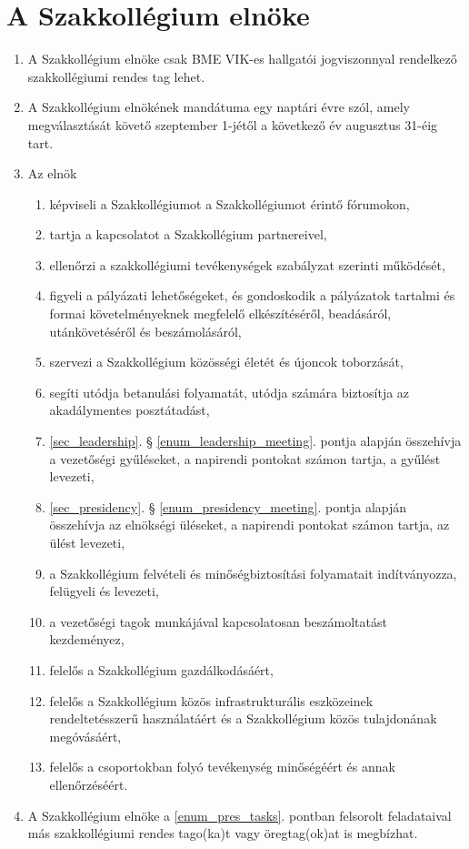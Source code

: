 \documentclass[12pt]{report}
\begin{document}

\section{A Szakkollégium elnöke} \label{sec_president}

\begin{enumerate}
\item A Szakkollégium elnöke csak BME VIK-es hallgatói jogviszonnyal rendelkező szakkollégiumi rendes tag lehet.
\item A Szakkollégium elnökének mandátuma egy naptári évre szól, amely megválasztását követő szeptember 1-jétől a következő év augusztus 31-éig tart.
\item Az elnök \label{enum_pres_tasks}

\begin{enumerate} 
  \item képviseli a Szakkollégiumot a Szakkollégiumot érintő fórumokon,
  \item tartja a kapcsolatot a Szakkollégium partnereivel,
  \item ellenőrzi a szakkollégiumi tevékenységek szabályzat szerinti működését,
  \item figyeli a pályázati lehetőségeket, és gondoskodik a pályázatok tartalmi és formai követelményeknek megfelelő elkészítéséről, beadásáról, utánkövetéséről és beszámolásáról,
  \item szervezi a Szakkollégium közösségi életét és újoncok toborzását,
  \item segíti utódja betanulási folyamatát, utódja számára biztosítja az akadálymentes posztátadást,
  \item \ref{sec_leadership}. § \ref{enum_leadership_meeting}. pontja alapján összehívja a vezetőségi gyűléseket, a napirendi pontokat számon tartja, a gyűlést levezeti,
  \item \ref{sec_presidency}. § \ref{enum_presidency_meeting}. pontja alapján összehívja az elnökségi üléseket, a napirendi pontokat számon tartja, az ülést levezeti,
  \item a Szakkollégium felvételi és minőségbiztosítási folyamatait indítványozza, felügyeli és levezeti,
  \item a vezetőségi tagok munkájával kapcsolatosan beszámoltatást kezdeményez,
  \item felelős a Szakkollégium gazdálkodásáért,
  \item felelős a Szakkollégium közös infrastrukturális eszközeinek rendeltetésszerű használatáért és a Szakkollégium közös tulajdonának megóvásáért,
  \item felelős a csoportokban folyó tevékenység minőségéért és annak ellenőrzéséért.  
\end{enumerate}

\item A Szakkollégium elnöke a \ref{enum_pres_tasks}. pontban felsorolt feladataival más szakkollégiumi rendes tago(ka)t vagy öregtag(ok)at is megbízhat.
\end{enumerate}
\end{document}
